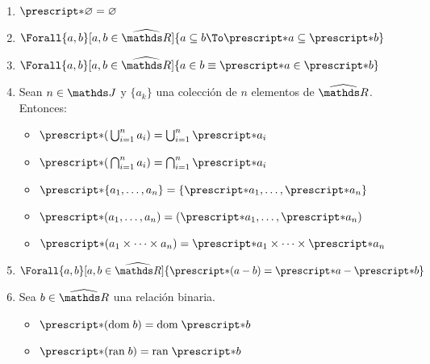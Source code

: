 \begin{lemma}\label{lema:stR}~
  \begin{enumerate}
    \item $\st{\varnothing} = \varnothing$
    \item $\Forall{a,b}[a,b\in\Rh]{a \subseteq b \To \st{a} \subseteq \st{b}}$
    \item $\Forall{a,b}[a,b\in\Rh]{a\in b \equiv \st{a} \in \st{b}}$
    \item Sean $n\in\J$ y $\{a_k\}$ una colección de $n$ elementos de
          $\Rh$. Entonces:
          \begin{itemize}
            \item $\st{\left(\,\bigcup_{i=1}^n a_i\right)}=\bigcup_{i=1}^n \st{a_i}$
            \item $\st{\left(\,\bigcap_{i=1}^n a_i\right)}=\bigcap_{i=1}^n \st{a_i}$
            \item $\st{\{a_1,\dots,a_n\}} = \{\st{a_1},\dots,\st{a_n}\}$
            \item $\st{(a_1,\dots,a_n)} = (\st{a_1},\dots,\st{a_n})$
            \item $\st{(a_1 \times \dots \times a_n)} = 
                    \st{a_1} \times \dots \times \st{a_n}$
          \end{itemize}
    \item $\Forall{a,b}[a,b\in\Rh]{\st{(a - b)} = \st{a} - \st{b}}$
    \item Sea $b\in\Rh$ una relación binaria.
          \begin{itemize}
            \item $\st{(\dom b)} = \dom \st{b}$
            \item $\st{(\ran b)} = \ran \st{b}$
          \end{itemize}
  \end{enumerate}
\end{lemma}
\pagebreak

